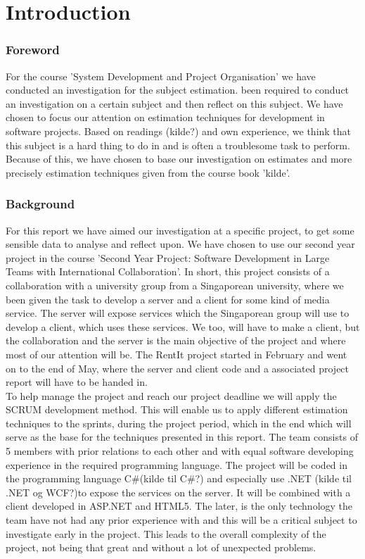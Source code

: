 \part{Introduction}
\section{Foreword}
For the course 'System Development and Project Organisation' we have conducted an investigation for the subject estimation. been required to conduct an investigation on a certain subject and then reflect on this subject. We have chosen to focus our attention on estimation techniques for development in software projects. Based on readings (kilde?) and own experience, we think that this subject is a hard thing to do in and is often a troublesome task to perform. Because of this, we have chosen to base our investigation on estimates and more precisely estimation techniques given from the course book 'kilde'. 

\section{Background}
For this report we have aimed our investigation at a specific project, to get some sensible data to analyse and reflect upon. We have chosen to use our second year project in the course 'Second Year Project: Software Development in Large Teams with International Collaboration'. In short, this project consists of a collaboration with a university group from a Singaporean university, where we been given the task to develop a server and a client for some kind of media service. The server will expose services which the Singaporean group will use to develop a client, which uses these services. We too, will have to make a client, but the collaboration and the server is the main objective of the project  and where most of our attention will be. The RentIt project started in February and went on to the end of May, where the server and client code and a associated project report will have to be handed in. \\ 

To help manage the project and reach our project deadline we will apply the SCRUM development method. This will enable us to apply different estimation techniques to the sprints, during the project period, which in the end which will serve as the base for the techniques presented in this report. The team consists of 5 members with prior relations to each other and with equal software developing experience in the required programming language. The project will be coded in the programming language C\#(kilde til C\#?) and especially use .NET (kilde til .NET og WCF?)to expose the services on the server. It will be combined with a client developed in ASP.NET and HTML5. The later, is the only technology the team have not had any prior experience with and this will be a critical subject to investigate early in the project. This leads to the overall complexity of the project, not being that great and without a lot of unexpected problems. 

